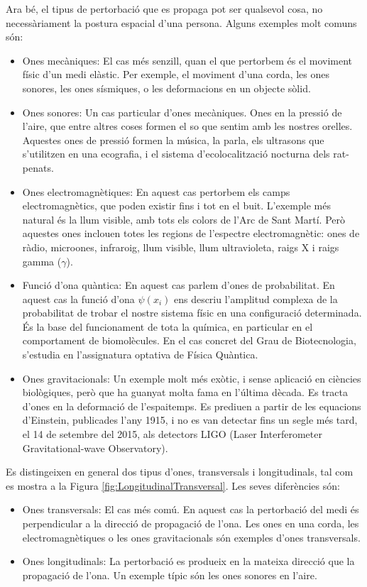 \documentclass[12pt]{book}
\begin{document}
Ara bé, el tipus de pertorbació que es propaga pot ser qualsevol cosa, no necessàriament la postura espacial d'una persona. Alguns exemples molt comuns són:
%
\begin{itemize}
    \item Ones mecàniques: El cas més senzill, quan el que pertorbem és el moviment físic d'un medi elàstic. Per exemple, el moviment d'una corda, les ones sonores, les ones sísmiques, o les deformacions en un objecte sòlid.
    \item Ones sonores: Un cas particular d'ones mecàniques. Ones en la pressió de l'aire, que entre altres coses formen el so que sentim amb les nostres orelles. Aquestes ones de pressió formen la música, la parla, els ultrasons que s'utilitzen en una ecografia, i el sistema d'ecolocalització nocturna dels rat-penats. 
    \item Ones electromagnètiques: En aquest cas pertorbem els camps electromagnètics, que poden existir fins i tot en el buit. L'exemple més natural és la llum visible, amb tots els colors de l'Arc de Sant Martí. Però aquestes ones inclouen totes les regions de l'espectre electromagnètic: ones de ràdio, microones, infraroig, llum visible, llum ultravioleta, raigs X i raigs gamma ($\gamma$).
    \item Funció d'ona quàntica: En aquest cas parlem d'ones de probabilitat. En aquest cas la funció d'ona $\psi(x_i)$ ens descriu l'amplitud complexa de la probabilitat de trobar el nostre sistema físic en una configuració determinada. És la base del funcionament de tota la química, en particular en el comportament de biomolècules. En el cas concret del Grau de Biotecnologia, s'estudia en l'assignatura optativa de Física Quàntica.
    \item Ones gravitacionals: Un exemple molt més exòtic, i sense aplicació en ciències biològiques, però que ha guanyat molta fama en l'última dècada. Es tracta d'ones en la deformació de l'espaitemps. Es prediuen a partir de les equacions d'Einstein, publicades l'any 1915, i no es van detectar fins un segle més tard, el 14 de setembre del 2015, als detectors LIGO (Laser Interferometer Gravitational-wave Observatory).
\end{itemize}
%
Es distingeixen en general dos tipus d'ones, transversals i longitudinals, tal com es mostra a la Figura \ref{fig:LongitudinalTransversal}. Les seves diferències són:
%
\begin{itemize}
    \item Ones transversals: El cas més comú. En aquest cas la pertorbació del medi és perpendicular a la direcció de propagació de l'ona. Les ones en una corda, les electromagnètiques o les ones gravitacionals són exemples d'ones transversals.
    \item Ones longitudinals: La pertorbació es produeix en la mateixa direcció que la propagació de l'ona. Un exemple típic són les ones sonores en l'aire.
\end{itemize}
\end{document}
